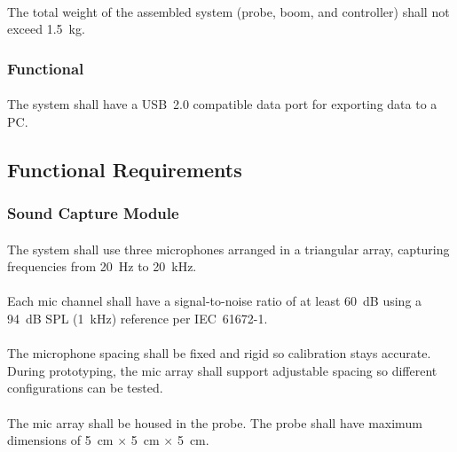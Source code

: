 \paragraph{}
The total weight of the assembled system (probe, boom, and controller) shall not exceed 1.5~kg.

\subsubsection{Functional}

\paragraph{}
The system shall have a USB~2.0 compatible data port for exporting data to a PC.

\subsection{Functional Requirements}

\subsubsection{Sound Capture Module}

\paragraph{}
The system shall use three microphones arranged in a triangular array, capturing frequencies from 20~Hz to 20~kHz.

\paragraph{}
Each mic channel shall have a signal-to-noise ratio of at least 60~dB using a 94~dB SPL (1~kHz) reference per IEC~61672-1.

\paragraph{}
The microphone spacing shall be fixed and rigid so calibration stays accurate.  During prototyping, the mic array shall support adjustable spacing so different configurations can be tested.

\paragraph{}
The mic array shall be housed in the probe.  The probe shall have maximum dimensions of 5~cm $\times$ 5~cm $\times$ 5~cm.

